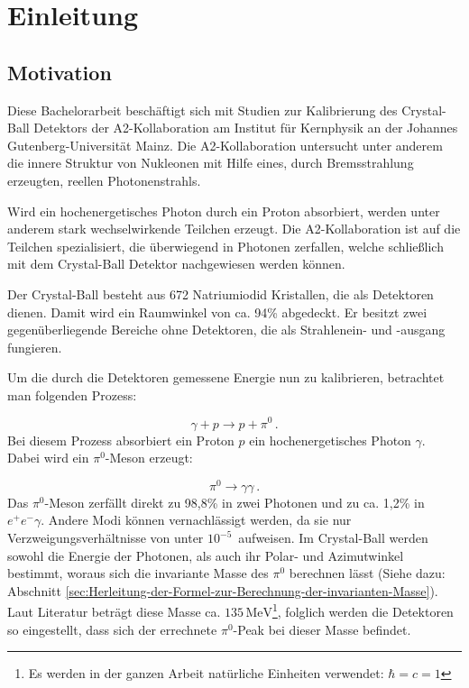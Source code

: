 \documentclass[a4paper,11pt,oneside,final,german,openbib,pdftex]{scrbook}
\begin{document}
\renewcommand\contentsname{Inhaltsverzeichnis}
\renewcommand\figurename{Abbildung}
\renewcommand\tablename{Tabelle}
\tableofcontents
\clearpage

\mainmatter
\sloppy

\chapter{Einleitung}

\section{Motivation}
{
	Diese Bachelorarbeit beschäftigt sich mit Studien zur Kalibrierung des Crystal-Ball Detektors der A2-Kollaboration am Institut für Kernphysik an der Johannes Gutenberg-Universität Mainz.
	Die A2-Kollaboration untersucht unter anderem die innere Struktur von Nukleonen mit Hilfe eines, durch Bremsstrahlung erzeugten, reellen Photonenstrahls. 
	
	Wird ein hochenergetisches Photon durch ein Proton absorbiert, werden unter anderem stark wechselwirkende Teilchen erzeugt. 
	Die A2-Kollaboration ist auf die Teilchen spezialisiert, die \"uberwiegend in Photonen zerfallen, welche schließlich mit dem Crystal-Ball Detektor nachgewiesen werden können. 
	
	Der Crystal-Ball besteht aus 672 Natriumiodid Kristallen, die als Detektoren dienen. Damit wird ein Raumwinkel von ca. 94\% abgedeckt.
	Er besitzt zwei gegen\"uberliegende Bereiche ohne Detektoren, die als Strahlenein- und -ausgang fungieren.
	
	Um die durch die Detektoren gemessene Energie nun zu kalibrieren, betrachtet man folgenden Prozess:
	
\begin{equation}
	\gamma + p \rightarrow p + \pi^0 \,.
	\label{eq.gammascattering}
\end{equation} 
Bei diesem Prozess absorbiert ein Proton $p$ ein hochenergetisches Photon $\gamma$. Dabei wird ein $\pi^0$-Meson erzeugt:

	\begin{equation}
		\pi^0\rightarrow \gamma \gamma \,.
		\label{eq.pi0decay}
	\end{equation}
Das $\pi^0$-Meson zerfällt direkt zu 98,8\% in zwei Photonen und zu ca. 1,2\% in $e^+e^- \gamma$. Andere Modi können vernachlässigt werden, da sie nur Verzweigungsverh\"altnisse von unter $10^{-5}$\ aufweisen. Im Crystal-Ball werden sowohl die Energie der Photonen, als auch ihr Polar- und Azimutwinkel bestimmt, woraus sich die invariante Masse des $\pi^0$ berechnen lässt (Siehe dazu: Abschnitt \ref{sec:Herleitung-der-Formel-zur-Berechnung-der-invarianten-Masse}).
Laut Literatur betr\"agt diese Masse ca. $135\,\text{MeV}$\footnote{Es werden in der ganzen Arbeit nat\"urliche Einheiten verwendet: $\hbar=c=1$}\cite{PDG16}, folglich werden die Detektoren so eingestellt, dass sich der errechnete $\pi^0$-Peak bei dieser Masse befindet. 

}
\end{document}
